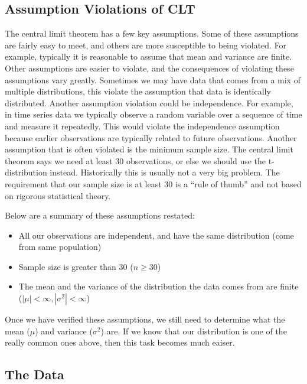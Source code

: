\documentclass[
]{book}
\begin{document}
\hypertarget{assumption-violations-of-clt}{%
\subsection{Assumption Violations of CLT}\label{assumption-violations-of-clt}}

The central limit theorem has a few key assumptions. Some of these assumptions are fairly easy to meet, and others are more susceptible to being violated. For example, typically it is reasonable to assume that mean and variance are finite. Other assumptions are easier to violate, and the consequences of violating these assumptions vary greatly. Sometimes we may have data that comes from a mix of multiple distributions, this violate the assumption that data is identically distributed. Another assumption violation could be independence. For example, in time series data we typically observe a random variable over a sequence of time and measure it repeatedly. This would violate the independence assumption because earlier observations are typically related to future observations. Another assumption that is often violated is the minimum sample size. The central limit theorem says we need at least 30 observations, or else we should use the t-distribution instead. Historically this is usually not a very big problem. The requirement that our sample size is at least 30 is a ``rule of thumb'' and not based on rigorous statistical theory.

Below are a summary of these assumptions restated:

\begin{itemize}
\item
  All our observations are independent, and have the same distribution (come from same population)
\item
  Sample size is greater than 30 (\(n\geq 30\))
\item
  The mean and the variance of the distribution the data comes from are finite (\(|\mu|< \infty, |\sigma^2|< \infty\))
\end{itemize}

Once we have verified these assumptions, we still need to determine what the mean (\(\mu\)) and variance (\(\sigma^2\)) are. If we know that our distribution is one of the really common ones above, then this task becomes much eaiser.

\hypertarget{the-data}{%
\subsection{The Data}\label{the-data}}
\end{document}
